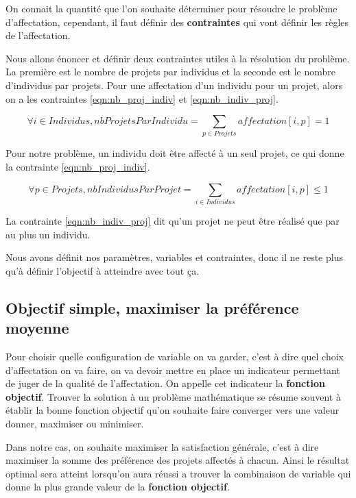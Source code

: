 \documentclass{polytech/polytech}
\begin{document}
On connait la quantité que l'on souhaite déterminer pour résoudre le problème d'affectation, cependant, il faut définir des \textbf{contraintes} qui vont définir les règles de l'affectation.

Nous allons énoncer et définir deux contraintes utiles à la résolution du problème. La première est le nombre de projets par individus et la seconde est le nombre d'individus par projets.
Pour une affectation d'un individu pour un projet, alors on a les contraintes \eqref{eqn:nb_proj_indiv} et \eqref{eqn:nb_indiv_proj}.

\begin{equation}
\label{eqn:nb_proj_indiv}
\forall i \in Individus, nbProjetsParIndividu= \sum_{p \in Projets} affectation[i,p] = 1
\end{equation}

Pour notre problème, un individu doit être affecté à un seul projet, ce qui donne la contrainte \eqref{eqn:nb_proj_indiv}.

\begin{equation}
\label{eqn:nb_indiv_proj}
\forall p \in Projets, nbIndividusParProjet= \sum_{i \in Individus} affectation[i,p] \leqslant 1
\end{equation}

La contrainte \eqref{eqn:nb_indiv_proj} dit qu'un projet ne peut être réalisé que par au plus un individu.

Nous avons définit nos paramètres, variables et contraintes, donc il ne reste plus qu'à définir l'objectif à atteindre avec tout ça.
\subsection{Objectif simple, maximiser la préférence moyenne}
\label{sec:max_pref_moy}

Pour choisir quelle configuration de variable on va garder, c'est à dire quel choix d'affectation on va faire, on va devoir mettre en place un indicateur permettant de juger de la qualité de l'affectation.
On appelle cet indicateur la \textbf{fonction objectif}.
Trouver la solution à un problème mathématique se résume souvent à établir la bonne fonction objectif qu'on souhaite faire converger vers une valeur donner, maximiser ou minimiser.


Dans notre cas, on souhaite maximiser la satisfaction générale, c'est à dire maximiser la somme des préférence des projets affectés à chacun. Ainsi le résultat optimal sera atteint lorsqu'on aura réussi a trouver la combinaison de variable qui donne la plus grande valeur de la \textbf{fonction objectif}.
\end{document}
